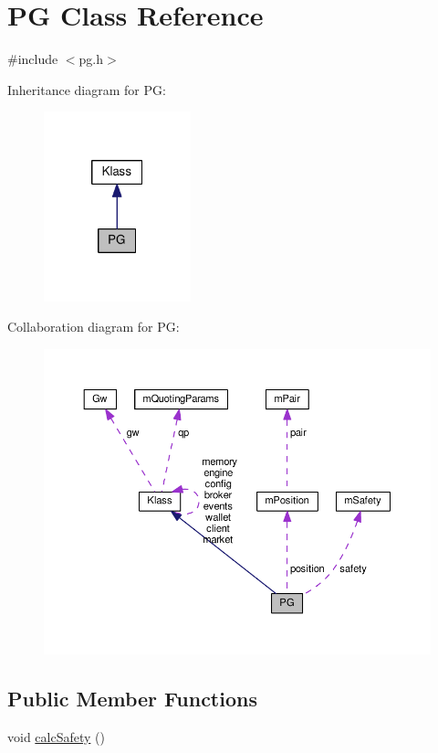 \hypertarget{class_k_1_1_p_g}{}\section{PG Class Reference}
\label{class_k_1_1_p_g}


{\ttfamily \#include $<$pg.\+h$>$}



Inheritance diagram for PG\+:
\nopagebreak
\begin{figure}[H]
\begin{center}
\leavevmode
\includegraphics[width=121pt]{class_k_1_1_p_g__inherit__graph}
\end{center}
\end{figure}


Collaboration diagram for PG\+:
\nopagebreak
\begin{figure}[H]
\begin{center}
\leavevmode
\includegraphics[width=350pt]{class_k_1_1_p_g__coll__graph}
\end{center}
\end{figure}
\subsection*{Public Member Functions}
\begin{DoxyCompactItemize}
\item 
void \hyperlink{class_k_1_1_p_g_af9636072c7613569127b37ecbfda5299}{calc\+Safety} ()
\end{DoxyCompactItemize}

